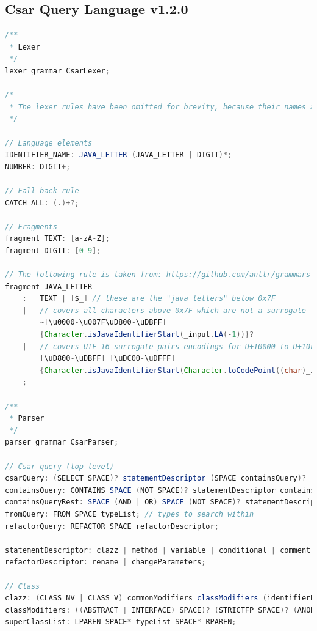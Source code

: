 \documentclass[12pt, letterpaper]{article}
\begin{document}
\subsection{Csar Query Language v1.2.0}
\label{apx:CsarQueryLanguagev120}

\begin{lstlisting}[language=Java]
/**
 * Lexer
 */
lexer grammar CsarLexer;

/*
 * The lexer rules have been omitted for brevity, because their names are very good indicators of exactly what they are. Each rule represents a literal or range of literals. You can find the full grammar in the `design-docs/query-language' folder within the project.
 */

// Language elements
IDENTIFIER_NAME: JAVA_LETTER (JAVA_LETTER | DIGIT)*;
NUMBER: DIGIT+;

// Fall-back rule
CATCH_ALL: (.)+?;

// Fragments
fragment TEXT: [a-zA-Z];
fragment DIGIT: [0-9];

// The following rule is taken from: https://github.com/antlr/grammars-v4/blob/master/java8/Java8.g4
fragment JAVA_LETTER
    :   TEXT | [$_] // these are the "java letters" below 0x7F
    |   // covers all characters above 0x7F which are not a surrogate
        ~[\u0000-\u007F\uD800-\uDBFF]
        {Character.isJavaIdentifierStart(_input.LA(-1))}?
    |	// covers UTF-16 surrogate pairs encodings for U+10000 to U+10FFFF
        [\uD800-\uDBFF] [\uDC00-\uDFFF]
        {Character.isJavaIdentifierStart(Character.toCodePoint((char)_input.LA(-2), (char)_input.LA(-1)))}?
    ;

/**
 * Parser
 */
parser grammar CsarParser;

// Csar query (top-level)
csarQuery: (SELECT SPACE)? statementDescriptor (SPACE containsQuery)? (SPACE fromQuery)? (SPACE refactorQuery)? EOF;
containsQuery: CONTAINS SPACE (NOT SPACE)? statementDescriptor containsQueryRest*;
containsQueryRest: SPACE (AND | OR) SPACE (NOT SPACE)? statementDescriptor;
fromQuery: FROM SPACE typeList; // types to search within
refactorQuery: REFACTOR SPACE refactorDescriptor;

statementDescriptor: clazz | method | variable | conditional | comment;
refactorDescriptor: rename | changeParameters;

// Class
clazz: (CLASS_NV | CLASS_V) commonModifiers classModifiers (identifierName | regexIdentifierName) superClassList?;
classModifiers: ((ABSTRACT | INTERFACE) SPACE)? (STRICTFP SPACE)? (ANONYMOUS SPACE)? (INNER SPACE)?;
superClassList: LPAREN SPACE* typeList SPACE* RPAREN;


\end{lstlisting}
\end{document}
